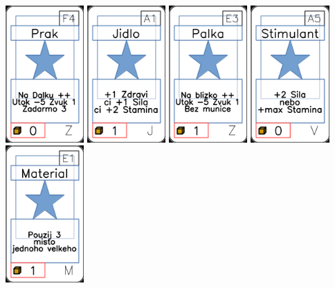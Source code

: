 \documentclass[a4paper]{article}
\begin{document}
	\includegraphics[width=3.0cm]{img-1_88}
	\includegraphics[width=3.0cm]{img-1_0}
	\includegraphics[width=3.0cm]{img-1_82}
	\includegraphics[width=3.0cm]{img-1_64}
	\includegraphics[width=3.0cm]{img-1_50}
\end{document}

